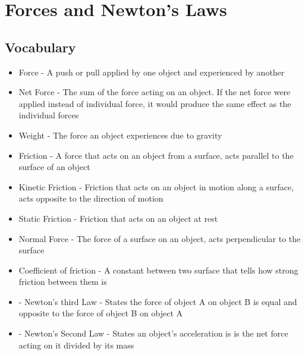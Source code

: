 \section{Forces and Newton's Laws}

\subsection{Vocabulary}
\begin{itemize}
    \item Force - A push or pull applied by one object and experienced by another
    \item Net Force - The sum of the force acting on an object. If the net force were applied instead of individual force, it would produce the same effect as the individual forces
    \item Weight - The force an object experiences due to gravity
    \item Friction - A force that acts on an object from a surface, acts parallel to the surface of an object
    \item Kinetic Friction - Friction that acts on an object in motion along a surface, acts opposite to the direction of motion
    \item  Static Friction - Friction that acts on an object at rest
    \item Normal Force - The force of a surface on an object, acts perpendicular to the surface
    \item Coefficient of friction - A constant between two surface that tells how strong friction between them is
    \item - Newton's third Law - States the force of object A on object B is equal and opposite to the force of object B on object A
    \item - Newton's Second Law - States an object's acceleration is is the net force acting on it divided by its mass
\end{itemize}

